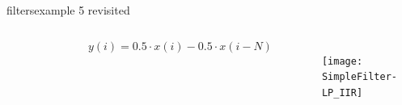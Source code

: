     
	\begin{frame}{filters}{example 5 revisited}
        \vspace{-5mm}
        \begin{columns}
	        \begin{figure}
				\begin{center}
                
				\end{center}
	        \end{figure}
        
            \begin{equation*}
        		y(i) = 0.5\cdot x(i) - 0.5\cdot x(i-N)
        	\end{equation*}
            \begin{figure}
                \centerline{\texttt{[image: SimpleFilter-LP\_IIR]}}
            \end{figure}
        \end{columns}
	\end{frame}	
	

